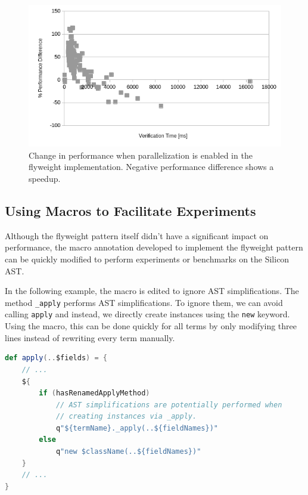 \documentclass[11pt]{article}
\begin{document}
    \begin{figure}[H]
        \includegraphics[width=\linewidth]{parallelization-flyweight.png}
        \caption{Change in performance when parallelization is enabled in the flyweight implementation. Negative performance difference shows a speedup.}
        \label{fig:parallelization-flyweight}
    \end{figure}


    \subsection{Using Macros to Facilitate Experiments}

    Although the flyweight pattern itself didn't have a significant impact on performance,
    the macro annotation developed to implement the flyweight pattern can
    be quickly modified to perform experiments or benchmarks on the Silicon AST.

    In the following example, the macro is edited to ignore AST simplifications.
    The method \texttt{\_apply} performs AST simplifications. To ignore 
    them, we can avoid calling \texttt{apply} and instead,
    we directly create instances using the \texttt{new} keyword.
    Using the macro, this can be done quickly for all terms by only modifying three lines
    instead of rewriting every term manually.

    \begin{lstlisting}[language=Scala, caption=Use AST simplifications as normal.]
def apply(..$fields) = {
    // ...
    ${
        if (hasRenamedApplyMethod)
            // AST simplifications are potentially performed when
            // creating instances via _apply.
            q"${termName}._apply(..${fieldNames})"
        else
            q"new $className(..${fieldNames})"
    }
    // ...
}  
    \end{lstlisting}
\end{document}
